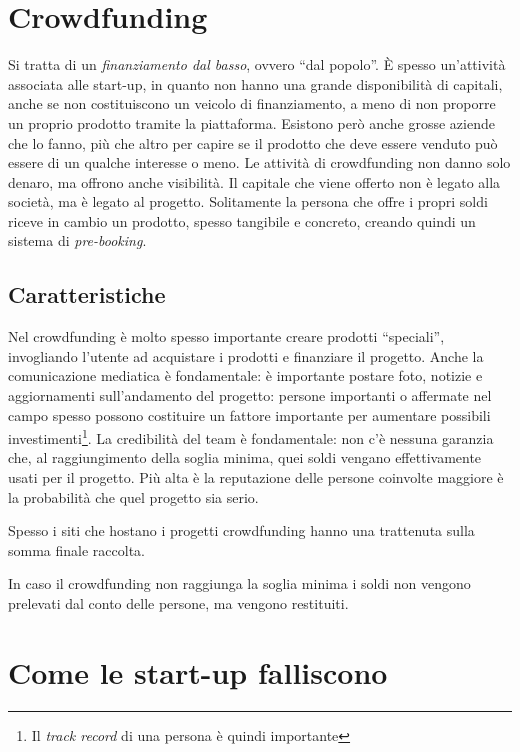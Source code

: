 \section{Crowdfunding}

Si tratta di un \textit{finanziamento dal basso}, ovvero ``dal popolo''. È
spesso un'attività associata alle start-up, in quanto non hanno una grande
disponibilità di capitali, anche se non costituiscono un veicolo di
finanziamento, a meno di non proporre un proprio prodotto tramite la
piattaforma. Esistono però anche grosse aziende che lo fanno, più che altro per
capire se il prodotto che deve essere venduto può essere di un qualche interesse
o meno. Le attività di crowdfunding non danno solo denaro, ma offrono anche
visibilità. Il capitale che viene offerto non è legato alla società, ma è legato
al progetto. Solitamente la persona che offre i propri soldi riceve in cambio un
prodotto, spesso tangibile e concreto, creando quindi un sistema di
\textit{pre-booking}.

\subsection{Caratteristiche}

Nel crowdfunding è molto spesso importante creare prodotti ``speciali'',
invogliando l'utente ad acquistare i prodotti e finanziare il progetto. Anche
la comunicazione mediatica è fondamentale: è importante postare foto, notizie e
aggiornamenti sull'andamento del progetto: persone importanti o affermate nel
campo spesso possono costituire un fattore importante per aumentare possibili
investimenti\footnote{Il \textit{track record} di una persona è quindi
importante}. La credibilità del team è fondamentale: non c'è nessuna garanzia
che, al raggiungimento della soglia minima, quei soldi vengano effettivamente
usati per il progetto. Più alta è la reputazione delle persone coinvolte
maggiore è la probabilità che quel progetto sia serio. 

Spesso i siti che hostano i progetti crowdfunding hanno una trattenuta sulla
somma finale raccolta.

In caso il crowdfunding non raggiunga la soglia minima i soldi non vengono
prelevati dal conto delle persone, ma vengono restituiti.

\section{Come le start-up falliscono}

